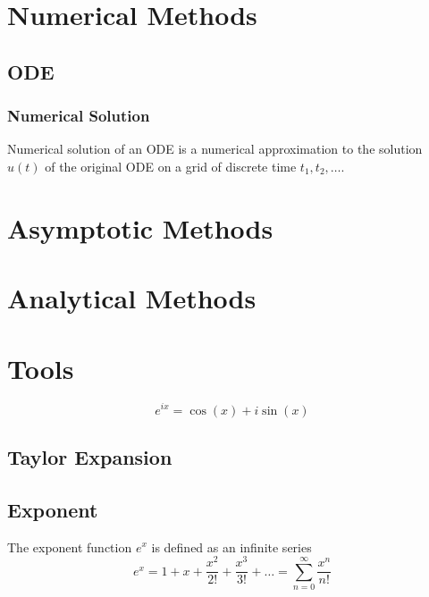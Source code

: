 \documentclass{blog}
\begin{document}
\section{Numerical Methods}
\subsection{ODE}
\subsubsection{Numerical Solution}
\begin{definition}
    Numerical solution of an ODE is a numerical approximation to the solution $u(t)$
    of the original ODE on a grid of discrete time $t_{1}, t_{2}, \dots$.
\end{definition}

\section{Asymptotic Methods}

\section{Analytical Methods}

\appendix
\section{Tools}
\begin{definition}
    \begin{equation}
        e^{ix} = \cos(x) + i\sin(x)
    \end{equation}
\end{definition}

\subsection{Taylor Expansion}
\begin{definition}
\end{definition}

\subsection{Exponent}
\begin{definition}[exponent]
    The exponent function $e^{x}$ is defined as an infinite series
    \begin{equation}
        e^{x} = 1 + x + \frac{x^{2}}{2!} + \frac{x^{3}}{3!} + \dots = \sum_{n=0}^{\infty} \frac{x^{n}}{n!}
    \end{equation}
\end{definition}
\end{document}
